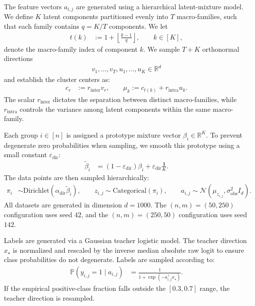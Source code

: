 \documentclass{article}
\newcommand{\bb}{\mathbb}
\newcommand{\R}{\bb R}
\newcommand{\eqdef}{:=}
\theoremstyle{plain}
\begin{document}
The feature vectors $a_{i,j}$ are generated using a hierarchical latent-mixture model. We define $K$ latent components partitioned evenly into $T$ macro-families, such that each family contains $q=K/T$ components. We let
\begin{align*}
    t(k)&\eqdef 1+\left\lfloor\frac{k-1}{q}\right\rfloor,
    \qquad k\in[K],
\end{align*}
denote the macro-family index of component $k$. We sample $T+K$ orthonormal directions
\begin{align*}
    v_1,\ldots,v_T,u_1,\ldots,u_K\in\R^d
\end{align*}
and establish the cluster centers as:
\begin{align*}
    c_r &\eqdef r_{\mathrm{inter}}v_r,
    \qquad
    \mu_k \eqdef c_{t(k)} + r_{\mathrm{intra}}u_k .
\end{align*}
The scalar $r_{\mathrm{inter}}$ dictates the separation between distinct macro-families, while $r_{\mathrm{intra}}$ controls the variance among latent components within the same macro-family.

Each group $i \in [n]$ is assigned a prototype mixture vector $\beta_i\in\R^K$. To prevent degenerate zero probabilities when sampling, we smooth this prototype using a small constant $\varepsilon_{\mathrm{dir}}$:
\begin{align*}
    \widetilde\beta_i
    &=
    (1-\varepsilon_{\mathrm{dir}})\beta_i
    +
    \varepsilon_{\mathrm{dir}}\frac{\mathbf{1}}{K}.
\end{align*}
The data points are then sampled hierarchically:
\begin{align*}
    \pi_i&\sim \mathrm{Dirichlet}(\alpha_{\mathrm{dir}}\widetilde\beta_i),
    \qquad
    z_{i,j}\sim \mathrm{Categorical}(\pi_i),
    \qquad
    a_{i,j}\sim \mathcal{N}(\mu_{z_{i,j}},\sigma_{\mathrm{obs}}^2 I_d).
\end{align*}
All datasets are generated in dimension $d=1000$. The $(n,m)=(50,250)$ configuration uses seed $42$, and the $(n,m)=(250,50)$ configuration uses seed $142$.

Labels are generated via a Gaussian teacher logistic model. The teacher direction $x_\star$ is normalized and rescaled by the inverse median absolute raw logit to ensure class probabilities do not degenerate. Labels are sampled according to:
\begin{align*}
    \mathbb{P}(y_{i,j}=1\mid a_{i,j})
    &=
    \frac{1}{1+\exp(-a_{i,j}^{\top}x_\star)}.
\end{align*}
If the empirical positive-class fraction falls outside the $[0.3, 0.7]$ range, the teacher direction is resampled.
\end{document}
